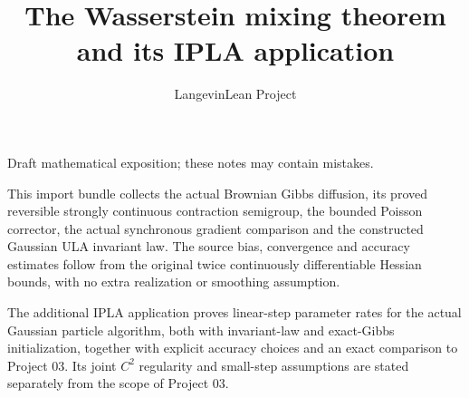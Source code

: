 \documentclass[11pt,a4paper]{article}
\title{\texorpdfstring{The Wasserstein mixing theorem and its IPLA application}{The Wasserstein mixing theorem and its IPLA application}}
\author{LangevinLean Project}
\date{}
\begin{document}
\maketitle
Draft mathematical exposition; these notes may contain mistakes.


This import bundle collects the actual Brownian Gibbs diffusion, its proved reversible strongly continuous contraction semigroup, the bounded Poisson corrector, the actual synchronous gradient comparison and the constructed Gaussian ULA invariant law. The source bias, convergence and accuracy estimates follow from the original twice continuously differentiable Hessian bounds, with no extra realization or smoothing assumption.



The additional IPLA application proves linear-step parameter rates for the actual Gaussian particle algorithm, both with invariant-law and exact-Gibbs initialization, together with explicit accuracy choices and an exact comparison to Project 03. Its joint \(C^2\) regularity and small-step assumptions are stated separately from the scope of Project 03.
\end{document}
